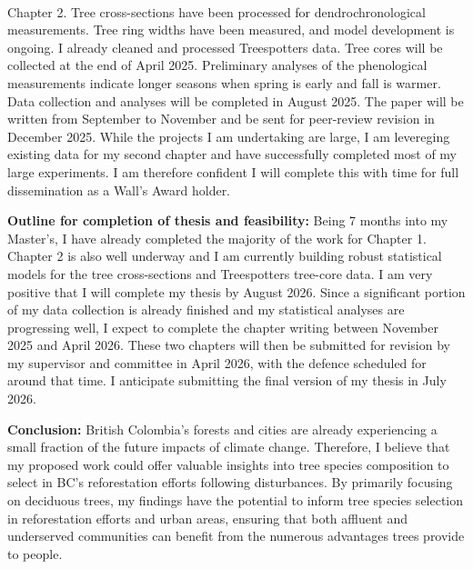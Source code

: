 \documentclass[11pt,letter]{article}
\begin{document}
\\
Chapter 2. Tree cross-sections have been processed for dendrochronological measurements. Tree ring widths have been measured, and model development is ongoing. I already cleaned and processed Treespotters data. Tree cores will be collected at the end of April  2025. Preliminary analyses of the phenological measurements indicate longer seasons when spring is early and fall is warmer. Data collection and analyses will be completed in August 2025. The paper will be written from September to November and be sent for peer-review revision in December 2025.
While the projects I am undertaking are large, I am levereging existing data for my second chapter and have successfully completed most of my large experiments. I am therefore confident I will complete this with time for full dissemination as a Wall's Award holder. 
\par
\textbf{Outline for completion of thesis and feasibility:} Being 7 months into my Master’s, I have already completed the majority of the work for Chapter 1. Chapter 2 is also well underway and I am currently building robust statistical models for the tree cross-sections and Treespotters tree-core data. 
I am very positive that I will complete my thesis by August 2026. Since a significant portion of my data collection is already finished and my statistical analyses are progressing well, I expect to complete the chapter writing between November 2025 and April 2026. These two chapters will then be submitted for revision by my supervisor and committee in April 2026, with the defence scheduled for around that time. I anticipate submitting the final version of my thesis in July 2026.

\textbf{Conclusion:} British Colombia’s forests and cities are already experiencing a small fraction of the future impacts of climate change. Therefore, I believe that my proposed work could offer valuable insights into tree species composition to select in BC's reforestation efforts following disturbances. By primarily focusing on deciduous trees, my findings have the potential to inform tree species selection in reforestation efforts and urban areas, ensuring that both affluent and underserved communities can benefit from the numerous advantages trees provide to people.

\end{document}
